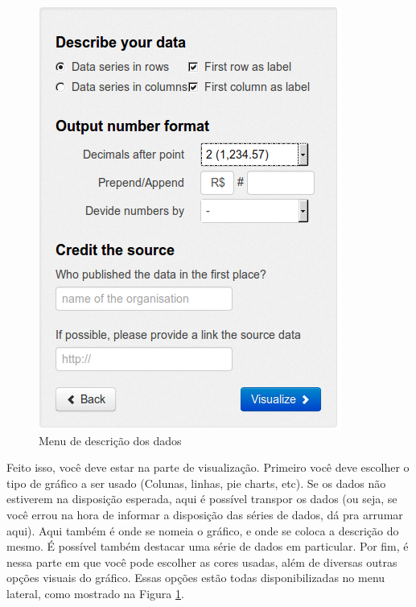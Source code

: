\documentclass[12pt,onecolumn]{article}
\begin{document}
    
    \begin{figure}[H]
      \begin{center}
        \includegraphics[scale = 0.5]{datawrapper-describe.png}
        \caption{Menu de descrição dos dados}
        \label{fig:datawrapper-describe}
      \end{center}
    \end{figure}
    
    Feito isso, você deve estar na parte de visualização. Primeiro você deve escolher
    o tipo de gráfico a ser usado (Colunas, linhas, pie charts, etc). Se os dados não
    estiverem na disposição esperada, aqui é possível transpor os dados (ou seja, se
    você errou na hora de informar a disposição das séries de dados, dá pra arrumar 
    aqui). Aqui também é onde se nomeia o gráfico, e onde se coloca a descrição do
    mesmo. É possível também destacar uma série de dados em particular. Por fim, 
    é nessa parte em que você pode escolher as cores usadas, além de diversas outras
    opções visuais do gráfico. Essas opções estão todas disponibilizadas no menu
    lateral, como mostrado na Figura \ref{fig:datawrapper-describe}.
    
\end{document}
